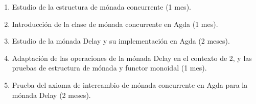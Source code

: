 \documentclass[11pt,a4paper]{article}
\begin{document}
\begin{enumerate}

\item Estudio de la estructura de mónada concurrente (1 mes).

\item Introducción de la clase de mónada concurrente en Agda (1 mes).

\item Estudio de la mónada Delay y su implementación en Agda (2 meses).

\item Adaptación de las operaciones de la mónada Delay en el contexto de
2, y las pruebas de estructura de mónada y functor monoidal (1 mes).

\item Prueba del axioma de intercambio de mónada concurrente en Agda
para la mónada Delay (2 meses).

\end{enumerate}



\end{document}
